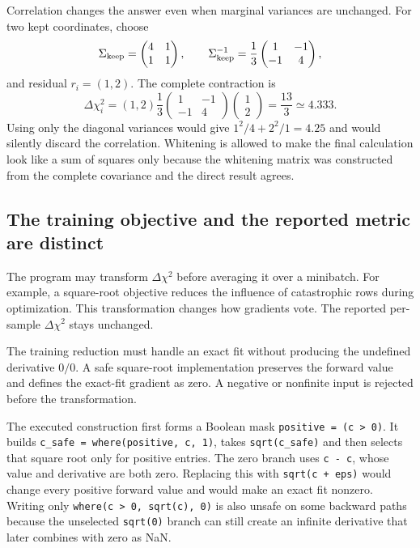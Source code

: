 \documentclass[10pt,aps,prd,twocolumn,nofootinbib]{revtex4-2}
\newcommand{\code}[1]{\texttt{#1}}
\begin{document}
Correlation changes the answer even when marginal variances are unchanged.
For two kept coordinates, choose
\begin{equation*}
 \Sigma_{\rm keep}=
 \begin{pmatrix}4&1\\1&1\end{pmatrix},\qquad
 \Sigma_{\rm keep}^{-1}=\frac13
 \begin{pmatrix}1&-1\\-1&4\end{pmatrix},
\end{equation*}
and residual $r_i=(1,2)$.  The complete contraction is
\begin{equation*}
 \Delta\chi_i^2=(1,2)\frac13
 \begin{pmatrix}1&-1\\-1&4\end{pmatrix}
 \begin{pmatrix}1\\2\end{pmatrix}=\frac{13}{3}\simeq4.333.
\end{equation*}
Using only the diagonal variances would give $1^2/4+2^2/1=4.25$ and would
silently discard the correlation.  Whitening is allowed to make the final
calculation look like a sum of squares only because the whitening matrix was
constructed from the complete covariance and the direct result agrees.

\subsection{The training objective and the reported metric are distinct}

The program may transform $\Delta\chi^2$ before averaging it over a minibatch.
For example, a square-root objective reduces the influence of catastrophic
rows during optimization.  This transformation changes how gradients vote.
The reported per-sample $\Delta\chi^2$ stays unchanged.

The training reduction must handle an exact fit without producing the
undefined derivative $0/0$.  A safe square-root implementation preserves the
forward value and defines the exact-fit gradient as zero.  A negative or
nonfinite input is rejected before the transformation.

The executed construction first forms a Boolean mask
\code{positive = (c > 0)}.  It builds
\code{c\_safe = where(positive, c, 1)}, takes
\code{sqrt(c\_safe)} and then selects that square root only for positive
entries.  The zero branch uses \code{c - c}, whose value and derivative are
both zero.  Replacing this with \code{sqrt(c + eps)} would change every
positive forward value and would make an exact fit nonzero.  Writing only
\code{where(c > 0, sqrt(c), 0)} is also unsafe on some backward paths because
the unselected \code{sqrt(0)} branch can still create an infinite derivative
that later combines with zero as NaN.
\end{document}
